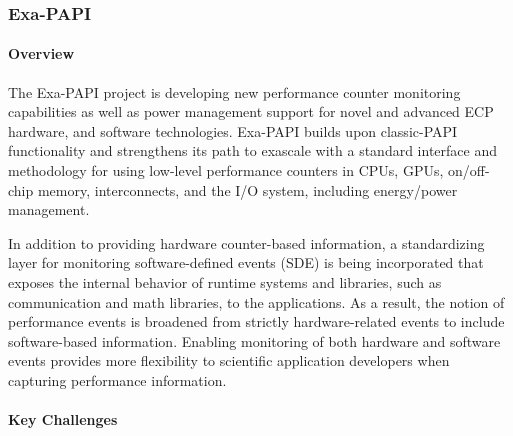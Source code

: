 \subsubsection{ Exa-PAPI}\label{subsubsect:exapapi}

\paragraph{Overview} 


The Exa-PAPI project is developing new performance counter monitoring 
capabilities as well as power management support for novel and advanced 
ECP hardware, and software technologies.
Exa-PAPI builds upon classic-PAPI functionality and strengthens its path to
exascale with a standard interface and methodology for using
low-level performance counters in CPUs, GPUs, on/off-chip memory, interconnects, 
and the I/O system, including energy/power management. 

In addition to providing hardware counter-based information, a standardizing layer 
for monitoring software-defined events (SDE) is being incorporated that exposes 
the internal behavior of runtime systems and libraries, such as communication and 
math libraries, to the applications. As a result, the notion of performance events is 
broadened from strictly hardware-related events to include software-based 
information. Enabling monitoring of both hardware and software events provides 
more flexibility to scientific application developers when capturing performance 
information.


\paragraph{Key Challenges}


